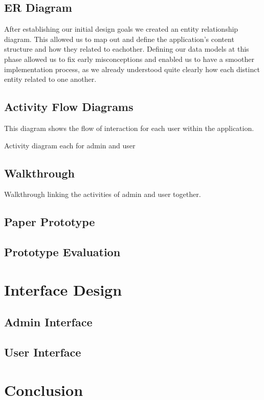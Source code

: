 \documentclass{l3proj}
\begin{document}
\subsection{ER Diagram}
	
After establishing our initial design goals we created an entity relationship diagram. This allowed us to map out and define the application's content structure and how they related to eachother. Defining our data models at this phase allowed us to fix early misconceptions and enabled us to have a smoother implementation process, as we already understood quite clearly how each distinct entity related to one another.



\subsection{Activity Flow Diagrams}
	
This diagram shows the flow of interaction for each user within the application. 

Activity diagram each for admin and user 
	\subsection{Walkthrough}
	Walkthrough linking the activities of admin and user together.

	\subsection{Paper Prototype}
	\subsection{Prototype Evaluation}

\section{Interface Design}
	\subsection{Admin Interface}
	\subsection{User Interface}


\section{Conclusion}
\end{document}
